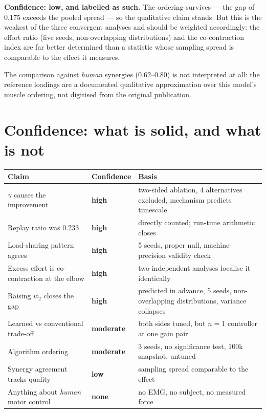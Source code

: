 \textbf{Confidence: low, and labelled as such.} The ordering survives --- the gap
of 0.175 exceeds the pooled spread --- so the qualitative claim stands. But this
is the weakest of the three convergent analyses and should be weighted
accordingly: the effort ratio (five seeds, non-overlapping distributions) and the
co-contraction index are far better determined than a statistic whose sampling
spread is comparable to the effect it measures.

The comparison against \emph{human} synergies (0.62--0.80) is not interpreted at
all: the reference loadings are a documented qualitative approximation over this
model's muscle ordering, not digitised from the original publication.

\section{Confidence: what is solid, and what is not}

\begin{center}
\begin{tabular}{@{} L{7.0cm} C{2.4cm} L{4.6cm} @{}}
\toprule
\textbf{Claim} & \textbf{Confidence} & \textbf{Basis} \\
\midrule
$\gamma$ causes the improvement & \textbf{high} & two-sided ablation, 4 alternatives excluded, mechanism predicts timescale \\
Replay ratio was 0.233 & \textbf{high} & directly counted; run-time arithmetic closes \\
Load-sharing pattern agrees & \textbf{high} & 5 seeds, proper null, machine-precision validity check \\
Excess effort is co-contraction at the elbow & \textbf{high} & two independent analyses localise it identically \\
Raising $w_2$ closes the gap & \textbf{high} & predicted in advance, 5 seeds, non-overlapping distributions, variance collapses \\
Learned vs conventional trade-off & \textbf{moderate} & both sides tuned, but $n = 1$ controller at one gain pair \\
Algorithm ordering & \textbf{moderate} & 3 seeds, no significance test, 100k snapshot, untuned \\
Synergy agreement tracks quality & \textbf{low} & sampling spread comparable to the effect \\
Anything about \emph{human} motor control & \textbf{none} & no EMG, no subject, no measured force \\
\bottomrule
\end{tabular}
\end{center}

